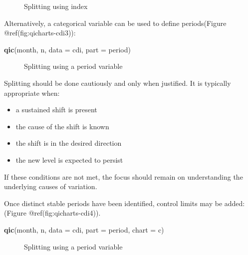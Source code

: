 \documentclass[
]{book}
\makeatletter
\newenvironment{Shaded}{\begin{snugshade}}{\end{snugshade}}
\newcommand{\AttributeTok}[1]{\textcolor[rgb]{0.13,0.29,0.53}{#1}}
\newcommand{\FunctionTok}[1]{\textcolor[rgb]{0.13,0.29,0.53}{\textbf{#1}}}
\newcommand{\NormalTok}[1]{#1}
\newcommand{\StringTok}[1]{\textcolor[rgb]{0.31,0.60,0.02}{#1}}
\newcommand*\pandocbounded[1]{%
  \sbox\pandoc@box{#1}%
  \Gscale@div\@tempa{\textheight}{\dimexpr\ht\pandoc@box+\dp\pandoc@box\relax}%
  \Gscale@div\@tempb{\linewidth}{\wd\pandoc@box}%
  \ifdim\@tempb\p@<\@tempa\p@\let\@tempa\@tempb\fi%
  \ifdim\@tempa\p@<\p@\scalebox{\@tempa}{\usebox\pandoc@box}%
  \else\usebox{\pandoc@box}%
  \fi%
}
\providecommand{\tightlist}{%
  \setlength{\itemsep}{0pt}\setlength{\parskip}{0pt}}
\makeatother
\begin{document}
\begin{figure}
\centering
\pandocbounded{}
\caption{Splitting using index}
\end{figure}

Alternatively, a categorical variable can be used to define
periods(Figure @ref(fig:qicharts-cdi3)):

\begin{Shaded}
\begin{Highlighting}[]
\FunctionTok{qic}\NormalTok{(month, n, }\AttributeTok{data =}\NormalTok{ cdi, }\AttributeTok{part =}\NormalTok{ period)}
\end{Highlighting}
\end{Shaded}

\begin{figure}
\centering
\pandocbounded{}
\caption{Splitting using a period variable}
\end{figure}

Splitting should be done cautiously and only when justified. It is
typically appropriate when:

\begin{itemize}
\tightlist
\item
  a sustained shift is present
\item
  the cause of the shift is known
\item
  the shift is in the desired direction
\item
  the new level is expected to persist
\end{itemize}

If these conditions are not met, the focus should remain on
understanding the underlying causes of variation.

Once distinct stable periods have been identified, control limits may be
added: (Figure @ref(fig:qicharts-cdi4)).

\begin{Shaded}
\begin{Highlighting}[]
\FunctionTok{qic}\NormalTok{(month, n, }\AttributeTok{data =}\NormalTok{ cdi, }\AttributeTok{part =}\NormalTok{ period, }\AttributeTok{chart =} \StringTok{\textquotesingle{}c\textquotesingle{}}\NormalTok{)}
\end{Highlighting}
\end{Shaded}

\begin{figure}
\centering
\pandocbounded{}
\caption{Splitting using a period variable}
\end{figure}
\end{document}
